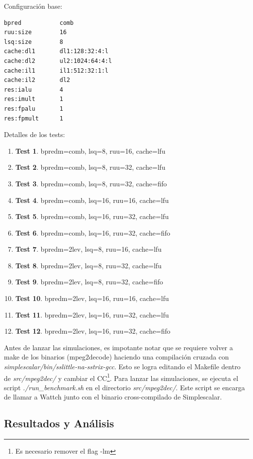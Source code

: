 \documentclass[journal]{IEEEtran}
\begin{document}
Configuraci\'on base:
\footnotesize \begin{verbatim}
bpred           comb
ruu:size        16
lsq:size        8
cache:dl1       dl1:128:32:4:l
cache:dl2       ul2:1024:64:4:l
cache:il1       il1:512:32:1:l
cache:il2       dl2
res:ialu        4
res:imult       1
res:fpalu       1
res:fpmult      1
\end{verbatim}
\normalsize

Detalles de los tests: \newline

\begin{enumerate}
\item \textbf{Test 1}.  bpredm=comb, lsq=8, ruu=16, cache=lfu
\item \textbf{Test 2}.  bpredm=comb, lsq=8, ruu=32, cache=lfu
\item \textbf{Test 3}.  bpredm=comb, lsq=8, ruu=32, cache=fifo
\item \textbf{Test 4}.  bpredm=comb, lsq=16, ruu=16, cache=lfu
\item \textbf{Test 5}.  bpredm=comb, lsq=16, ruu=32, cache=lfu
\item \textbf{Test 6}.  bpredm=comb, lsq=16, ruu=32, cache=fifo
\item \textbf{Test 7}.  bpredm=2lev, lsq=8, ruu=16, cache=lfu
\item \textbf{Test 8}.  bpredm=2lev, lsq=8, ruu=32, cache=lfu
\item \textbf{Test 9}.  bpredm=2lev, lsq=8, ruu=32, cache=fifo
\item \textbf{Test 10}. bpredm=2lev, lsq=16, ruu=16, cache=lfu
\item \textbf{Test 11}. bpredm=2lev, lsq=16, ruu=32, cache=lfu
\item \textbf{Test 12}. bpredm=2lev, lsq=16, ruu=32, cache=fifo \newline
\end{enumerate}

Antes de lanzar las simulaciones, es impotante notar que se requiere volver a make de los binarios (mpeg2decode) haciendo una compilaci\'on cruzada con \textit{simplescalar/bin/sslittle-na-sstrix-gcc}. Esto se logra editando
el Makefile dentro de \textit{src/mpeg2dec/} y cambiar el CC\footnote{Es necesario remover el flag -lm}.
Para lanzar las simulaciones, se ejecuta el script \textit{./run\_benchmark.sh} en el directorio \textit{src/mpeg2dec/}. Este script se encarga de llamar a Wattch junto con el binario cross-compilado de Simplescalar.

\subsection{Resultados y An\'alisis}
\end{document}
